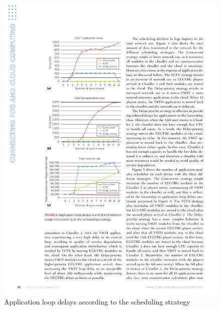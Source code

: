 \documentclass[10pt, pdf, xcolor=pdftex, dvipsnames, table]{beamer}
\begin{document}
\begin{frame}
 	\begin{figure}[htbp]
 		\centerline{\includegraphics[scale=1.2]{images/4a.pdf}}
 		\caption[Application loop delays according to the scheduling strategy]{Application loop delays according to the scheduling strategy}
 	\end{figure}
\end{frame}
\end{document}

